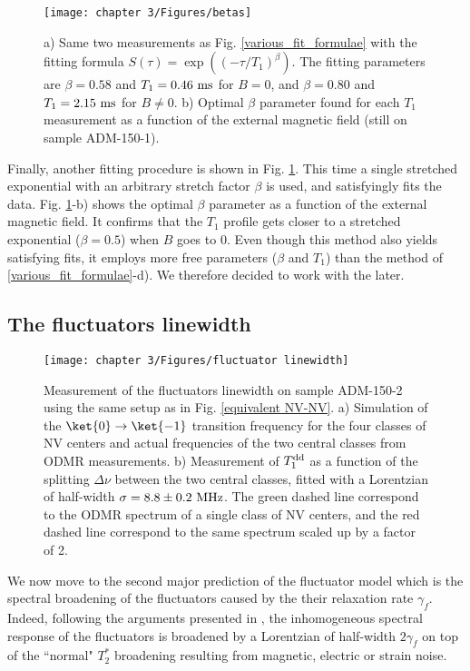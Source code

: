 \documentclass[a4paper, 11pt]{report}
\begin{document}
\begin{figure}[h]
\centering
\texttt{[image: chapter 3/Figures/betas]}
\caption{a) Same two measurements as Fig. \ref{various_fit_formulae} with the fitting formula $S(\tau)=\exp ((-\tau/T_1)^{\beta})$. The fitting parameters are $\beta=0.58$ and $T_1=0.46\ \rm ms$ for $B=0$, and $\beta=0.80$ and $T_1=2.15\ \rm ms$ for $B\neq0$. b) Optimal $\beta$ parameter found for each $T_1$ measurement as a function of the external magnetic field (still on sample ADM-150-1).}
\label{betas}
\end{figure}

Finally, another fitting procedure is shown in Fig. \ref{betas}. This time a single stretched exponential with an arbitrary stretch factor $\beta$ is used, and satisfyingly fits the data. Fig. \ref{betas}-b) shows the optimal $\beta$ parameter as a function of the external magnetic field. It confirms that the $T_1$ profile gets closer to a stretched exponential ($\beta=0.5$) when $B$ goes to 0. Even though this method also yields satisfying fits, it employs more free parameters ($\beta$ and $T_1$) than the method of \ref{various_fit_formulae}-d). We therefore decided to work with the later.

\subsection{The fluctuators linewidth}

\begin{figure}[h]
\centering
\texttt{[image: chapter 3/Figures/fluctuator linewidth]}
\caption{Measurement of the fluctuators linewidth on sample ADM-150-2 using the same setup as in Fig. \ref{equivalent NV-NV}. a) Simulation of the $\ket{0} \to \ket{-1}$ transition frequency for the four classes of NV centers and actual frequencies of the two central classes from ODMR measurements. b) Measurement of $T_1^{\rm dd}$ as a function of the splitting $\Delta \nu$ between the two central classes, fitted with a Lorentzian of half-width $\sigma=8.8 \pm 0.2\ \rm MHz$. The green dashed line correspond to the ODMR spectrum of a single class of NV centers, and the red dashed line correspond to the same spectrum scaled up by a factor of 2.}
\label{fluct linewidth}
\end{figure}

We now move to the second major prediction of the fluctuator model which is the spectral broadening of the fluctuators caused by the their relaxation rate $\gamma_f$. Indeed, following the arguments presented in \citep{choi2017depolarization}, the inhomogeneous spectral response of the fluctuators is broadened by a Lorentzian of half-width $2\gamma_f$ on top of the ``normal" $T_2^*$ broadening resulting from magnetic, electric or strain noise.
\end{document}
